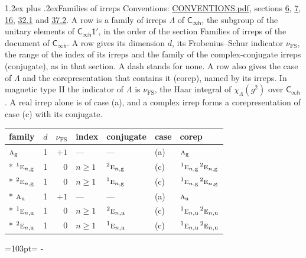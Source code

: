 \documentclass[10pt,a4paper]{article}
\makeatletter
\renewcommand\section{\@startsection{section}{1}{\z@}{-3ex plus -1ex minus -.2ex}%
  {1.2ex plus .2ex}{\normalfont\large\sffamily\bfseries\color{parttitle}}}
\newcommand{\needspace}[1]{\par\penalty-100\begingroup\dimen0=#1\relax\dimen2=\pagegoal
  \advance\dimen2-\pagetotal\ifdim\dimen0>\dimen2\relax\ifdim\dimen2>0pt\vfil\break\fi\fi
  \endgroup}
\numberwithin{equation}{section}
\newcommand{\grp}[1]{\mathsf{#1}}
\newcommand{\irr}[1]{\text{\normalfont\scshape #1}}
\newcommand{\conjpair}[1]{{}^{#1}}
\newcommand{\ptag}[1]{\mathrm{#1}}
\newcommand{\irchar}[1]{\chi_{#1}}
\newcommand{\fsind}{\nu_{\mathrm{FS}}}
\makeatother
\begin{document}
\section{Families of irreps}\label{s:families}
Conventions: \href{../../CONVENTIONS.pdf}{CONVENTIONS.pdf}, sections \href{../../../rotation/CONVENTIONS.pdf\#conv.6}{6}, \href{../../../rotation/CONVENTIONS.pdf\#conv.7}{7}, \href{../../../rotation/CONVENTIONS.pdf\#conv.16}{16}, \href{../../CONVENTIONS.pdf\#conv.32.1}{32.1} and \href{../../CONVENTIONS.pdf\#conv.37.2}{37.2}.
\leavevmode\label{n:irrep.Delta}\label{n:head.family.irreps}A row is a family of irreps $\Lambda$ of $\grp{C_{\infty h}}$, the subgroup of the unitary elements of $\grp{C_{\infty h}1'}$, in the order of the section Families of irreps of the document of \href{../../../rotation/data/pdf/Cinfh.pdf}{$\grp{C_{\infty h}}$}. \label{n:index.dimension}\label{n:index.frobenius}\label{n:head.index.family}\label{n:index.family}\label{n:head.conjugate}A row gives its dimension $d$, its Frobenius--Schur indicator $\fsind$, the range of the index of its irreps and the family of the complex-conjugate irreps (conjugate), as in that section. A dash stands for none. \label{n:head.case.corep}\label{n:head.corep}\label{n:function.character}A row also gives the case of $\Lambda$ and the corepresentation that contains it (corep), named by its irreps. In magnetic type II the indicator of $\Lambda$ is $\fsind$, the Haar integral of $\irchar{\Lambda}(g^2)$ over $\grp{C_{\infty h}}$. A real irrep alone is of case (a), and a complex irrep forms a corepresentation of case (c) with its conjugate.
{\small\renewcommand{\arraystretch}{1.25}\begin{longtable}{@{}lrrllll@{}}\toprule
family & $d$ & $\fsind$ & index & conjugate & case & corep\\\midrule\endhead
\bottomrule\endfoot\endlastfoot
$\irr{a}_{\ptag{g}}$ & 1 & $+1$ & --- & --- & (a) & $\irr{a}_{\ptag{g}}$\\*
$\conjpair{1}\irr{e}_{n,\ptag{g}}$ & 1 & $0$ & $n \ge 1$ & $\conjpair{2}\irr{e}_{n,\ptag{g}}$ & (c) & $\conjpair{1}\irr{e}_{n,\ptag{g}}\,\conjpair{2}\irr{e}_{n,\ptag{g}}$\\*
$\conjpair{2}\irr{e}_{n,\ptag{g}}$ & 1 & $0$ & $n \ge 1$ & $\conjpair{1}\irr{e}_{n,\ptag{g}}$ & (c) & $\conjpair{1}\irr{e}_{n,\ptag{g}}\,\conjpair{2}\irr{e}_{n,\ptag{g}}$\\*
$\irr{a}_{\ptag{u}}$ & 1 & $+1$ & --- & --- & (a) & $\irr{a}_{\ptag{u}}$\\*
$\conjpair{1}\irr{e}_{n,\ptag{u}}$ & 1 & $0$ & $n \ge 1$ & $\conjpair{2}\irr{e}_{n,\ptag{u}}$ & (c) & $\conjpair{1}\irr{e}_{n,\ptag{u}}\,\conjpair{2}\irr{e}_{n,\ptag{u}}$\\*
$\conjpair{2}\irr{e}_{n,\ptag{u}}$ & 1 & $0$ & $n \ge 1$ & $\conjpair{1}\irr{e}_{n,\ptag{u}}$ & (c) & $\conjpair{1}\irr{e}_{n,\ptag{u}}\,\conjpair{2}\irr{e}_{n,\ptag{u}}$\\
\bottomrule\end{longtable}}
\needspace{103pt}
\end{document}
